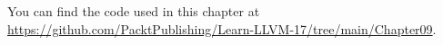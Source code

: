 You can find the code used in this chapter at \url{https://github.com/PacktPublishing/Learn-LLVM-17/tree/main/Chapter09}.